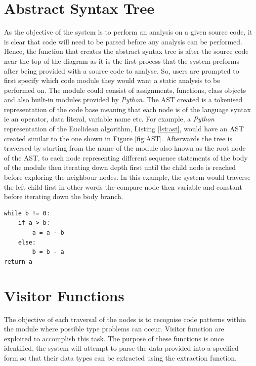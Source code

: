 \documentclass{l4proj}
\begin{document}
\section{Abstract Syntax Tree}
As the objective of the system is to perform an analysis on a given source code, it is clear that code will need to be parsed before any analysis can be performed. Hence, the function that creates the abstract syntax tree is after the source code near the top of the diagram as it is the first process that the system preforms after being provided with a source code to analyse. So, users are prompted to first specify which code module they would want a static analysis to be performed on. The module could consist of assignments, functions, class objects and also built-in modules provided by \emph{Python}. The AST created is a tokenised representation of the code base meaning that each node is of the language syntax ie an operator, data literal, variable name etc. For example, a \emph{Python} representation of the Euclidean algorithm, Listing \ref{lst:ast}, would have an AST created similar to the one shown in Figure \ref{fig:AST}. Afterwards the tree is traversed by starting from the name of the module also known as the root node of the AST, to each node representing different sequence statements of the body of the module then iterating down depth first until the child node is reached before exploring the neighbour nodes. In this example, the system would traverse the left child first in other words the compare node then variable and constant before iterating down the body branch.

\begin{lstlisting}[caption= A \emph{Python} representation of the Euclidean algorithm adapted from wikipedia \cite{astcode}, label={lst:ast}]
while b != 0:
    if a > b:
        a = a - b
    else:
        b = b - a
return a
\end{lstlisting}

\section{Visitor Functions}
\label{sec:visit}
The objective of each traversal of the nodes is to recognise code patterns within the module where possible type problems can occur. Visitor function are exploited to accomplish this task. The purpose of these functions is once identified, the system will attempt to parse the data provided into a specified form so that their data types can be extracted using the extraction function.
\end{document}
